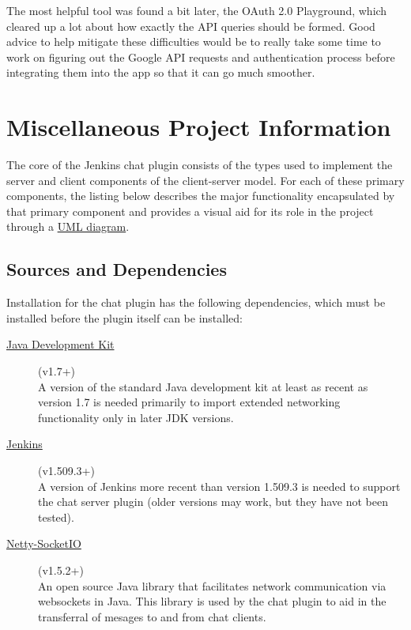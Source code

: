 \documentclass{article}
\begin{document}
			The most helpful tool
			was found a bit later, the OAuth 2.0 Playground, which cleared up a lot about
			how exactly the API queries should be formed. Good advice to help mitigate
			these difficulties would be to really take some time to work on figuring
			out the Google API requests and authentication process before integrating
			them into the app so that it can go much smoother.


	\section[Appendix]{Miscellaneous Project Information}
	The core of the Jenkins chat plugin consists of the types used to
	implement the server and client components of the client-server model.
	For each of these primary components, the listing below describes the
	major functionality encapsulated by that primary component and provides
	a visual aid for its role in the project through a 
	\href{http://www.csci.csusb.edu/dick/samples/uml0.html}{UML diagram}.

		\subsection[Dependencies]{Sources and Dependencies}
		Installation for the chat plugin has the following dependencies, which
		must be installed before the plugin itself can be installed:

		\begin{description}
			\item[\href{http://www.oracle.com/technetwork/java/javase/downloads/jdk7-downloads-1880260.html}{Java Development Kit}] (v1.7+) \hfill \\
			A version of the standard Java development kit at least as recent 
			as version 1.7 is needed primarily to import extended networking 
			functionality only in later JDK versions.

			\item[\href{http://jenkins-ci.org/}{Jenkins}] (v1.509.3+) \hfill \\
			A version of Jenkins more recent than version 1.509.3 is needed
			to support the chat server plugin (older versions may work, but they
			have not been tested).

			\item[\href{https://github.com/mrniko/netty-socketio/releases}{Netty-SocketIO}] (v1.5.2+) \hfill \\ 
			An open source Java library that facilitates network communication 
			via websockets in Java.  This library is used by the chat plugin
			to aid in the transferral of mesages to and from chat clients.
		\end{description}
\end{document}
